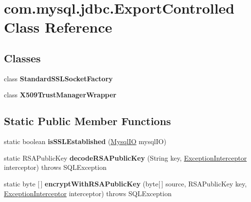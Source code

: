 \hypertarget{classcom_1_1mysql_1_1jdbc_1_1_export_controlled}{}\section{com.\+mysql.\+jdbc.\+Export\+Controlled Class Reference}
\label{classcom_1_1mysql_1_1jdbc_1_1_export_controlled}
\subsection*{Classes}
\begin{DoxyCompactItemize}
\item 
class {\bfseries Standard\+S\+S\+L\+Socket\+Factory}
\item 
class {\bfseries X509\+Trust\+Manager\+Wrapper}
\end{DoxyCompactItemize}
\subsection*{Static Public Member Functions}
\begin{DoxyCompactItemize}
\item 
\mbox{\label{classcom_1_1mysql_1_1jdbc_1_1_export_controlled_a47235bc238aa6d612630a2aa8795ff92}} 
static boolean {\bfseries is\+S\+S\+L\+Established} (\mbox{\hyperlink{classcom_1_1mysql_1_1jdbc_1_1_mysql_i_o}{Mysql\+IO}} mysql\+IO)
\item 
\mbox{\label{classcom_1_1mysql_1_1jdbc_1_1_export_controlled_a8fa24d194b23b152d2d4939d1d3de51f}} 
static R\+S\+A\+Public\+Key {\bfseries decode\+R\+S\+A\+Public\+Key} (String key, \mbox{\hyperlink{interfacecom_1_1mysql_1_1jdbc_1_1_exception_interceptor}{Exception\+Interceptor}} interceptor)  throws S\+Q\+L\+Exception 
\item 
\mbox{\label{classcom_1_1mysql_1_1jdbc_1_1_export_controlled_ab5f926a3f699126748a5a140cd39928e}} 
static byte \mbox{[}$\,$\mbox{]} {\bfseries encrypt\+With\+R\+S\+A\+Public\+Key} (byte\mbox{[}$\,$\mbox{]} source, R\+S\+A\+Public\+Key key, \mbox{\hyperlink{interfacecom_1_1mysql_1_1jdbc_1_1_exception_interceptor}{Exception\+Interceptor}} interceptor)  throws S\+Q\+L\+Exception 
\end{DoxyCompactItemize}
